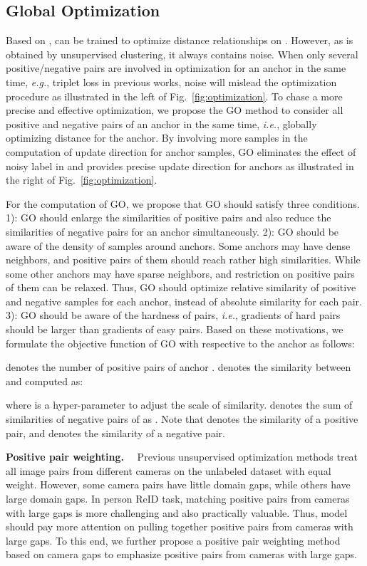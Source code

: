 \documentclass[sigconf]{acmart}
\begin{document}
\subsection{Global Optimization} 
\label{sec:go}
Based on ,  can be trained to optimize distance relationships on . However, as  is obtained by unsupervised clustering, it always contains noise. When only several positive/negative pairs are involved in optimization for an anchor in the same time, \textit{e.g.}, triplet loss in previous works, noise will mislead the optimization procedure as illustrated in the left of Fig.~\ref{fig:optimization}. To chase a more precise and effective optimization, we propose the GO method to consider all positive and negative pairs of an anchor in the same time, \textit{i.e.}, globally optimizing distance for the anchor. By involving more samples in the computation of update direction for anchor samples, GO eliminates the effect of noisy label in  and provides precise update direction for anchors as illustrated in the right of Fig.~\ref{fig:optimization}.

For the computation of GO, we propose that GO should satisfy three conditions. 
1): GO should enlarge the similarities of positive pairs and also reduce the similarities of negative pairs for an anchor simultaneously. 
2): GO should be aware of the density of samples around anchors. Some anchors may have dense neighbors, and positive pairs of them should reach rather high similarities. While some other anchors may have sparse neighbors, and restriction on positive pairs of them can be relaxed. Thus, GO should optimize relative similarity of positive and negative samples for each anchor, instead of absolute similarity for each pair. 
3): GO should be aware of the hardness of pairs, \textit{i.e.}, gradients of hard pairs should be larger than gradients of easy pairs. Based on these motivations, we formulate the objective function of GO with respective to the anchor  as follows:

 denotes the number of positive pairs of anchor .  denotes the similarity between   and  computed as:

where  is a hyper-parameter to adjust the scale of similarity. 
 denotes the sum of similarities of negative pairs of  as . Note that  denotes the similarity of a positive pair, and  denotes the similarity of a negative pair. 

\textbf{Positive pair weighting.} \ \  
Previous unsupervised optimization methods treat all image pairs from different cameras on the unlabeled dataset with equal weight. However, some camera pairs have little domain gaps, while others have large domain gaps. In person ReID task, matching positive pairs from cameras with large gaps is more challenging and also practically valuable. Thus, model should pay more attention on pulling together positive pairs from cameras with large gaps. To this end, we further propose a positive pair weighting method based on camera gaps to emphasize positive pairs from cameras with large gaps.
\end{document}
